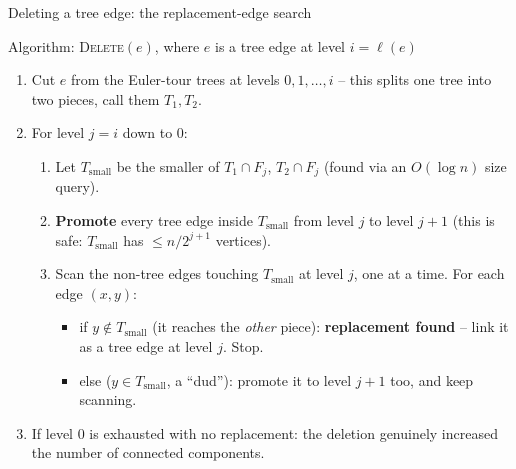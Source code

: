 \documentclass[11pt,aspectratio=169]{beamer}
\begin{document}
\begin{frame}{Deleting a tree edge: the replacement-edge search}
  \begin{block}{Algorithm: \textsc{Delete}$(e)$, where $e$ is a tree edge at level $i=\ell(e)$}
    \begin{enumerate}
      \item Cut $e$ from the Euler-tour trees at levels $0,1,\dots,i$ -- this splits
      one tree into two pieces, call them $T_1, T_2$.
      \item For level $j = i$ down to $0$:
      \begin{enumerate}
        \item Let $T_{\text{small}}$ be the smaller of $T_1 \cap F_j$, $T_2 \cap F_j$
        (found via an $O(\log n)$ size query).
        \item \textbf{Promote} every tree edge inside $T_{\text{small}}$ from level $j$
        to level $j+1$ (this is safe: $T_\text{small}$ has $\le n/2^{j+1}$ vertices).
        \item Scan the non-tree edges touching $T_\text{small}$ at level $j$, one at a
        time. For each edge $(x,y)$:
        \begin{itemize}
          \item if $y \notin T_\text{small}$ (it reaches the \emph{other} piece):
          \textbf{replacement found} -- link it as a tree edge at level $j$. Stop.
          \item else ($y \in T_\text{small}$, a ``dud''): promote it to level $j+1$
          too, and keep scanning.
        \end{itemize}
      \end{enumerate}
      \item If level $0$ is exhausted with no replacement: the deletion genuinely
      increased the number of connected components.
    \end{enumerate}
  \end{block}
\end{frame}
\end{document}
